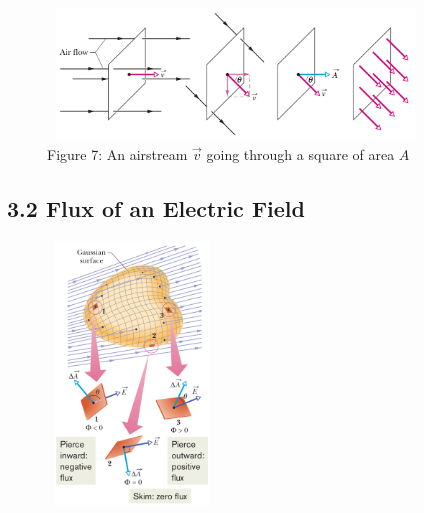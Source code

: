 \documentclass[12pt, a4paper]{article}
\begin{document}
		\begin{figure}[!htb]  %
			\centering
			\includegraphics[width=10cm,height=3.5cm]{Physics2_PNGs/elec-veloc-flux.png}
			\caption*{Figure 7: An airstream $\vec{v}$ going through a square of area $A$}
			\label{fig:flux-over-square}
		\end{figure}
	
	
		\subsection*{3.2 Flux of an Electric Field}
		
		\begin{figure}
			\includegraphics[width=4.5cm,height=7cm]{Physics2_PNGs/gaussian-elec-field.png}
			
			\label{fig:gaussian-elec-field}
		\end{figure}
		
\end{document}
